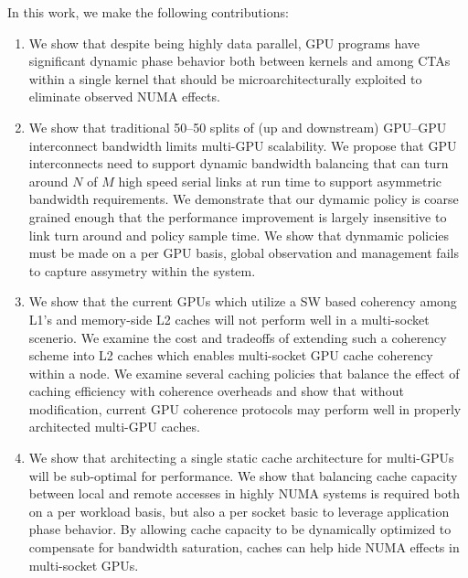 In this work, we make the following contributions:

\begin{enumerate}
\item
We show that despite being highly data parallel, GPU programs have significant
dynamic phase behavior both between kernels and among CTAs within a single
kernel that should be microarchitecturally exploited to eliminate observed
NUMA effects.

\item
We show that traditional 50--50 splits of (up and 
downstream) GPU--GPU interconnect bandwidth limits multi-GPU scalability.  We propose
that GPU interconnects need to support dynamic bandwidth balancing that can
turn around $N$ of $M$ high speed serial links at run time to support asymmetric
bandwidth requirements.  We demonstrate that our dymamic policy is coarse
grained enough that the performance improvement is largely insensitive to link turn 
around and policy sample time.  We show that dynmamic policies must be made on a
per GPU basis, global observation and management fails to capture assymetry 
within the system.

\item
We show that the current GPUs which utilize a SW based coherency among L1's and 
memory-side L2 caches will not perform well in a multi-socket scenerio.  
We examine the cost and tradeoffs of extending such a coherency scheme into L2 caches 
which enables multi-socket GPU cache coherency within a node.  We examine several
caching policies that balance the effect of caching efficiency with coherence overheads
and show that without modification, current GPU coherence protocols may perform
well in properly architected multi-GPU caches.

\item
We show that architecting a single static cache architecture for multi-GPUs will
be sub-optimal for performance. We show that balancing cache capacity between
local and remote accesses in highly NUMA systems is required both on a per
workload basis, but also a per socket basic to leverage application phase
behavior.  By allowing cache capacity to be dynamically optimized to compensate for
bandwidth saturation, caches can help hide NUMA effects in multi-socket GPUs.






\end{enumerate}
